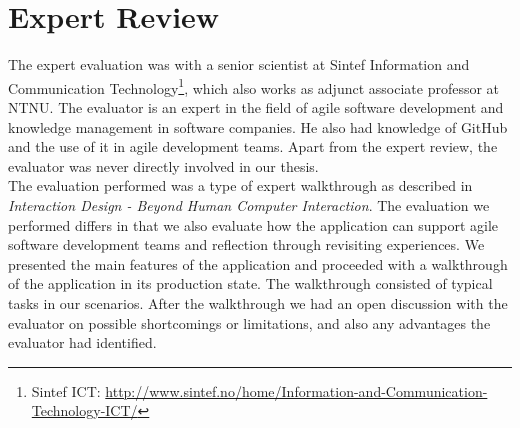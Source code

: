 \chapter{Expert Review}
The expert evaluation was with a senior scientist at Sintef Information and Communication Technology\footnote{Sintef ICT: \url{http://www.sintef.no/home/Information-and-Communication-Technology-ICT/}}, which also works as adjunct associate professor at NTNU. The evaluator is an expert in the field of agile software development and knowledge management in software companies. He also had knowledge of GitHub and the use of it in agile development teams.  Apart from the expert review, the evaluator was never directly involved in our thesis.  \\
The evaluation performed was a type of expert walkthrough as described in \emph{Interaction Design - Beyond Human Computer Interaction}\cite{rogers2011interaction}. The evaluation we performed differs in that we also evaluate how the application can support agile software development teams and reflection through revisiting experiences. We presented the main features of the application and proceeded with a walkthrough of the application in its production state. The walkthrough consisted of typical tasks in our scenarios. After the walkthrough we had an open discussion with the evaluator on possible shortcomings or limitations, and also any advantages the evaluator had identified. 

